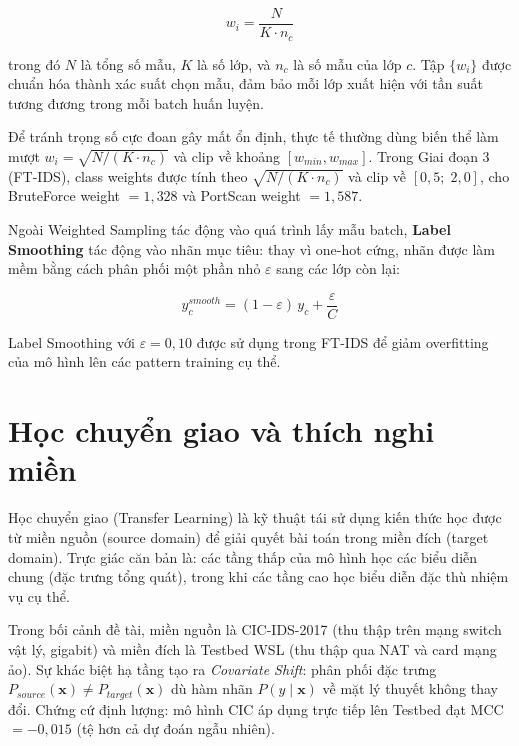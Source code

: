 \documentclass[../DoAn.tex]{subfiles}
\begin{document}
\begin{equation}
    w_i = \frac{N}{K \cdot n_c}
    \label{eq:class-weight}
\end{equation}

trong đó $N$ là tổng số mẫu, $K$ là số lớp, và $n_c$ là số mẫu của lớp $c$. Tập $\{w_i\}$ được chuẩn hóa thành xác suất chọn mẫu, đảm bảo mỗi lớp xuất hiện với tần suất tương đương trong mỗi batch huấn luyện.

Để tránh trọng số cực đoan gây mất ổn định, thực tế thường dùng biến thể làm mượt $w_i = \sqrt{N/(K \cdot n_c)}$ và clip về khoảng $[w_{min}, w_{max}]$. Trong Giai đoạn 3 (FT-IDS), class weights được tính theo $\sqrt{N/(K \cdot n_c)}$ và clip về $[0{,}5;\; 2{,}0]$, cho BruteForce weight $= 1{,}328$ và PortScan weight $= 1{,}587$.

Ngoài Weighted Sampling tác động vào quá trình lấy mẫu batch, \textbf{Label Smoothing} tác động vào nhãn mục tiêu: thay vì one-hot cứng, nhãn được làm mềm bằng cách phân phối một phần nhỏ $\varepsilon$ sang các lớp còn lại:

\begin{equation}
    y_c^{smooth} = (1 - \varepsilon)\, y_c + \frac{\varepsilon}{C}
    \label{eq:label-smooth}
\end{equation}

Label Smoothing với $\varepsilon = 0{,}10$ được sử dụng trong FT-IDS để giảm overfitting của mô hình lên các pattern training cụ thể.

\section{Học chuyển giao và thích nghi miền}
\label{sec:transfer}

Học chuyển giao (Transfer Learning) là kỹ thuật tái sử dụng kiến thức học được từ miền nguồn (source domain) để giải quyết bài toán trong miền đích (target domain). Trực giác căn bản là: các tầng thấp của mô hình học các biểu diễn chung (đặc trưng tổng quát), trong khi các tầng cao học biểu diễn đặc thù nhiệm vụ cụ thể.

Trong bối cảnh đề tài, miền nguồn là CIC-IDS-2017 (thu thập trên mạng switch vật lý, gigabit) và miền đích là Testbed WSL (thu thập qua NAT và card mạng ảo). Sự khác biệt hạ tầng tạo ra \textit{Covariate Shift}: phân phối đặc trưng $P_{source}(\mathbf{x}) \neq P_{target}(\mathbf{x})$ dù hàm nhãn $P(y \mid \mathbf{x})$ về mặt lý thuyết không thay đổi. Chứng cứ định lượng: mô hình CIC áp dụng trực tiếp lên Testbed đạt MCC $= -0{,}015$ (tệ hơn cả dự đoán ngẫu nhiên).
\end{document}
